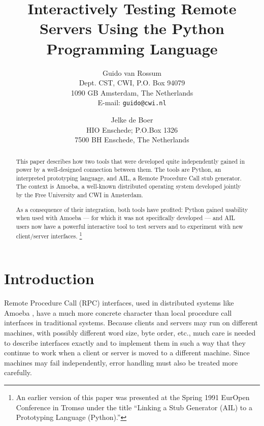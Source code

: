 \newcommand{\Cpp}{C\protect\raisebox{.18ex}{++}}

\title{
Interactively Testing Remote Servers Using the Python Programming Language
}

\author{
	Guido van Rossum \\
	Dept. CST, CWI, P.O. Box 94079 \\
	1090 GB Amsterdam, The Netherlands \\
	E-mail: {\tt guido@cwi.nl}
\and
	Jelke de Boer \\
	HIO Enschede; P.O.Box 1326 \\
	7500 BH  Enschede, The Netherlands
}



\maketitle

\begin{abstract}
This paper describes how two tools that were developed quite
independently gained in power by a well-designed connection between
them.  The tools are Python, an interpreted prototyping language, and
AIL, a Remote Procedure Call stub generator.  The context is Amoeba, a
well-known distributed operating system developed jointly by the Free
University and CWI in Amsterdam.

As a consequence of their integration, both tools have profited:
Python gained usability when used with Amoeba --- for which it was not
specifically developed --- and AIL users now have a powerful
interactive tool to test servers and to experiment with new
client/server interfaces.%
\footnote{
An earlier version of this paper was presented at the Spring 1991
EurOpen Conference in Troms{\o} under the title ``Linking a Stub
Generator (AIL) to a Prototyping Language (Python).''
}
\end{abstract}

\section{Introduction}

Remote Procedure Call (RPC) interfaces, used in distributed systems
like Amoeba
\cite{Amoeba:IEEE,Amoeba:CACM},
have a much more concrete character than local procedure call
interfaces in traditional systems.  Because clients and servers may
run on different machines, with possibly different word size, byte
order, etc., much care is needed to describe interfaces exactly and to
implement them in such a way that they continue to work when a client
or server is moved to a different machine.  Since machines may fail
independently, error handling must also be treated more carefully.

